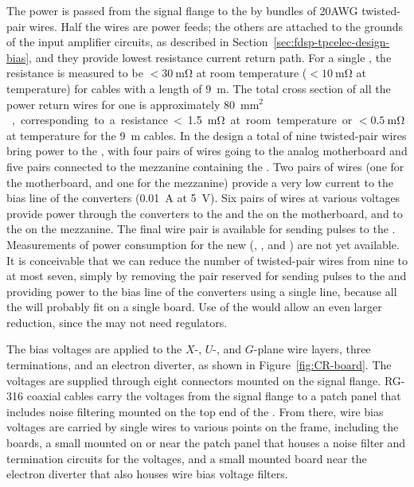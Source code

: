 The  power is passed from the signal flange to the 
 by bundles of \num{20}AWG twisted-pair wires. Half 
the wires are power feeds; the others are attached to the grounds 
of the input amplifier circuits, as described in 
Section~\ref{sec:fdsp-tpcelec-design-bias}, and they provide
lowest resistance current return path.
For a single , the resistance is measured to be 
$<\SI{30}{\milli\ohm}$ at room temperature ($<\SI{10}{\milli\ohm}$ 
at  temperature) for cables with a length of \SI{9}{m}. 
The total cross section of all the power return wires for one
 is approximately \SI{80}{mm$^2$}, corresponding to a
resistance <\SI{1.5}{\milli\ohm} at room temperature or 
$<\SI{0.5}{\milli\ohm}$ at  temperature for the
\SI{9}{m} cables.
In the  design %
a total of nine 
twisted-pair wires %
bring power to the
, with four pairs of wires going to the analog
motherboard and five pairs connected to the mezzanine containing
the . Two pairs of wires (one for the motherboard,
and one for the mezzanine) %
provide a very low
current to the bias line of the  converters 
(\SI{0.01}{A} at \SI{5}{V}). Six pairs of wires at %
various voltages %
provide power through the
 converters to the  and the 
on the motherboard, and to the  on the mezzanine.
The final wire pair is available for sending pulses to the
. %
Measurements 
of power consumption for the new  (, 
, and ) are not yet available.  It is conceivable that we can  reduce the number of twisted-pair
wires from %
nine %
to at most seven, simply by removing the pair
reserved for sending pulses to the  and %
providing power to the bias
line of the  converters using a single line, 
because all the  will probably fit on a single board.  
Use of the  would allow an even larger reduction, %
since the  may not need  regulators. 


The bias voltages are applied to the $X$-, $U$-, and $G$-plane 
wire layers, three  terminations, and an electron diverter, 
as shown in Figure~\ref{fig:CR-board}. The voltages are supplied 
through eight  connectors mounted on the signal flange. 
RG-316 coaxial cables carry the voltages from the signal flange to 
a patch panel  that includes noise filtering mounted on the top 
end of the . From there, wire bias voltages are carried by single wires to 
various points on the  frame, including the  
boards, a small  mounted on or near the patch panel that 
houses a noise filter and termination circuits for the   
voltages, and a small mounted board near the electron diverter 
that also houses wire bias voltage filters.

